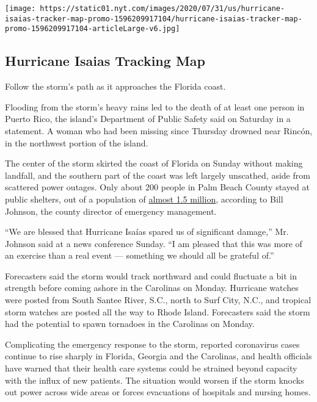 \href{https://www.nytimes.com/interactive/2020/07/31/us/hurricane-isaias-tracker-map.html}{}

\texttt{[image: https://static01.nyt.com/images/2020/07/31/us/hurricane-isaias-tracker-map-promo-1596209917104/hurricane-isaias-tracker-map-promo-1596209917104-articleLarge-v6.jpg]}

\hypertarget{hurricane-isaias-tracking-map}{%
\subsection{Hurricane Isaias Tracking
Map}\label{hurricane-isaias-tracking-map}}

Follow the storm's path as it approaches the Florida coast.

Flooding from the storm's heavy rains led to the death of at least one
person in Puerto Rico, the island's Department of Public Safety said on
Saturday in a statement. A woman who had been missing since Thursday
drowned near Rincón, in the northwest portion of the island.

The center of the storm skirted the coast of Florida on Sunday without
making landfall, and the southern part of the coast was left largely
unscathed, aside from scattered power outages. Only about 200 people in
Palm Beach County stayed at public shelters, out of a population of
\href{https://slack-redir.net/link?url=https\%3A\%2F\%2Fdiscover.pbcgov.org\%2Fpages\%2Fpbc_facts.aspx}{almost
1.5 million}, according to Bill Johnson, the county director of
emergency management.

``We are blessed that Hurricane Isaías spared us of significant
damage,'' Mr. Johnson said at a news conference Sunday. ``I am pleased
that this was more of an exercise than a real event --- something we
should all be grateful of.''

Forecasters said the storm would track northward and could fluctuate a
bit in strength before coming ashore in the Carolinas on Monday.
Hurricane watches were posted from South Santee River, S.C., north to
Surf City, N.C., and tropical storm watches are posted all the way to
Rhode Island. Forecasters said the storm had the potential to spawn
tornadoes in the Carolinas on Monday.

Complicating the emergency response to the storm, reported coronavirus
cases continue to rise sharply in Florida, Georgia and the Carolinas,
and health officials have warned that their health care systems could be
strained beyond capacity with the influx of new patients. The situation
would worsen if the storm knocks out power across wide areas or forces
evacuations of hospitals and nursing homes.

